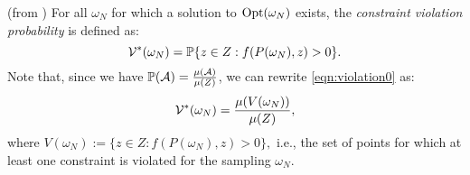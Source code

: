 \begin{definition}(from \cite{campi}) For all $\omega_N$ for which a solution to $\text{Opt}(\omega_N)$ exists, the \emph{constraint violation probability} is defined as:
\begin{equation}\label{eqn:violation0}
\mathcal{V}^*(\omega_N)=
      \mathbb{P}\{z \in Z: f(P(\omega_N), z) > 0\}.
\end{equation}
Note that, since we have $\mathbb{P}(\mathcal{A}) = \frac{\mu(\mathcal{A})}{\mu(Z)}$, we can rewrite \eqref{eqn:violation0} as:
\begin{equation*}
\mathcal{V}^*(\omega_N)=
      \frac{\mu(V(\omega_N))}{\mu(Z)},
\end{equation*}
where $V(\omega_N):=\{z \in Z: f(P(\omega_N), z) > 0\},$ i.e., the set of points for which at least one constraint is violated for the sampling $\omega_N$.
\end{definition}
%

